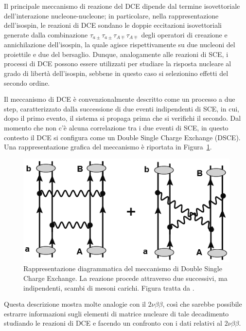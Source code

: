 %
%
Il principale meccanismo di reazione del DCE dipende dal termine isovettoriale dell'interazione nucleone-nucleone; in particolare, nella rappresentazione dell'isospin, le reazioni di DCE sondano le doppie eccitazioni isovettoriali generate dalla combinazione $\tau_{a\pm}\tau_{a\pm}\tau_{A\mp}\tau_{A\mp}$ degli operatori di creazione e annichilazione dell'isospin, la quale agisce rispettivamente su due nucleoni del proiettile e due del bersaglio.
Dunque, analogamente alle reazioni di SCE, i processi di DCE possono essere utilizzati per studiare la risposta nucleare al grado di libertà dell'isospin, sebbene in questo caso si selezionino effetti del secondo ordine.


Il meccanismo di DCE è convenzionalmente descritto come un processo a due step\cite{satchler:87}, caratterizzato dalla successione di due eventi indipendenti di SCE, in cui, dopo il primo evento, il sistema si propaga prima che si verifichi il secondo.
Dal momento che non c'è alcuna correlazione tra i due eventi di SCE, in questo contesto il DCE si configura come un Double Single Charge Exchange (DSCE). Una rappresentazione grafica del meccanismo è riportata in Figura~\ref{fig:DSCE}.
\begin{figure} [!t]
	\centering
	\includegraphics[scale=0.65]{Grafici/DSCE.png}
	\caption{Rappresentazione diagrammatica del meccanismo di Double Single Charge Exchange. La reazione procede attraverso due successivi, ma indipendenti, scambi di mesoni carichi. Figura tratta da \cite{cappuzzello:epja18}.} \label{fig:DSCE}
\end{figure}
Questa descrizione mostra molte analogie con il $2 \nu \beta \beta $, così che sarebbe possibile estrarre informazioni sugli elementi di matrice nucleare di tale decadimento studiando le reazioni di DCE e facendo un confronto con i dati relativi al $2 \nu \beta \beta $.

